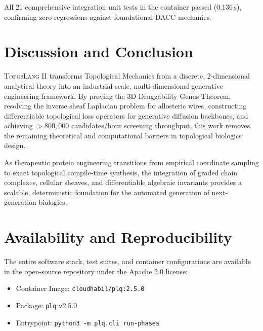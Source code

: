 \documentclass[11pt, a4paper]{article}
\theoremstyle{definition}
\theoremstyle{plain}
\theoremstyle{remark}
\newcommand{\ToposLang}{\textsc{ToposLang}}
\begin{document}
All 21 comprehensive integration unit tests in the container passed ($0.136\,\text{s}$), confirming zero regressions against foundational DACC mechanics.

\section{Discussion and Conclusion}
\label{sec:conclusion}

\ToposLang{} II transforms Topological Mechanics from a discrete, 2-dimensional analytical theory into an industrial-scale, multi-dimensional generative engineering framework. By proving the 3D Druggability Genus Theorem, resolving the inverse sheaf Laplacian problem for allosteric wires, constructing differentiable topological loss operators for generative diffusion backbones, and achieving $>800,000$ candidates/hour screening throughput, this work removes the remaining theoretical and computational barriers in topological biologics design.

As therapeutic protein engineering transitions from empirical coordinate sampling to exact topological compile-time synthesis, the integration of graded chain complexes, cellular sheaves, and differentiable algebraic invariants provides a scalable, deterministic foundation for the automated generation of next-generation biologics.

\section*{Availability and Reproducibility}
The entire software stack, test suites, and container configurations are available in the open-source repository under the Apache 2.0 license:
\begin{itemize}
    \item Container Image: \texttt{cloudhabil/plq:2.5.0}
    \item Package: \texttt{plq} v2.5.0
    \item Entrypoint: \texttt{python3 -m plq.cli run-phases}
\end{itemize}



\end{document}
